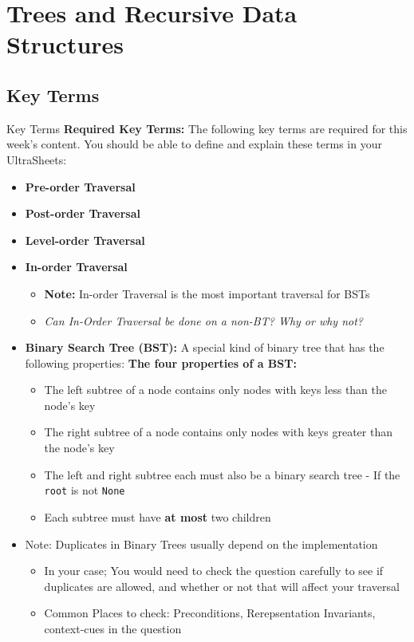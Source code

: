 \documentclass[hyperref={colorlinks,citecolor=blue,linkcolor=blue,urlcolor=blue}, aspectratio=1610]{beamer}
\begin{document}
\section{Trees and Recursive Data Structures}

\subsection{Key Terms}
\begin{frame}{Key Terms}
  \textbf{Required Key Terms:} The following key terms are required for this week's content. You should be able to define and explain these terms in your UltraSheets\texttrademark{}:
  \begin{itemize}
    \item \textbf{Pre-order Traversal}
    \item \textbf{Post-order Traversal} 
    \item \textbf{Level-order Traversal} 
    \item \textbf{In-order Traversal} 
    \begin{itemize}
      \item \textbf{Note:} In-order Traversal is the most important traversal for BSTs
      \item \textit{Can In-Order Traversal be done on a non-BT? Why or why not?}
    \end{itemize}
    \item \textbf{Binary Search Tree (BST):} A special kind of binary tree that has the following properties:
    \textbf{The four properties of a BST:}
    \begin{itemize}
      \item The left subtree of a node contains only nodes with keys less than the node's key
      \item The right subtree of a node contains only nodes with keys greater than the node's key
      \item The left and right subtree each must also be a binary search tree - If the \texttt{root} is not \texttt{None}
      \item Each subtree must have \textbf{at most} two children
    \end{itemize}
    \item Note: Duplicates in Binary Trees usually depend on the implementation
    \begin{itemize}
      \item In your case; You would need to check the question carefully to see if duplicates are allowed, and whether or not that will affect your traversal
      \item Common Places to check: Preconditions, Rerepsentation Invariants, context-cues in the question
    \end{itemize}
  \end{itemize}
\end{frame}
\end{document}
